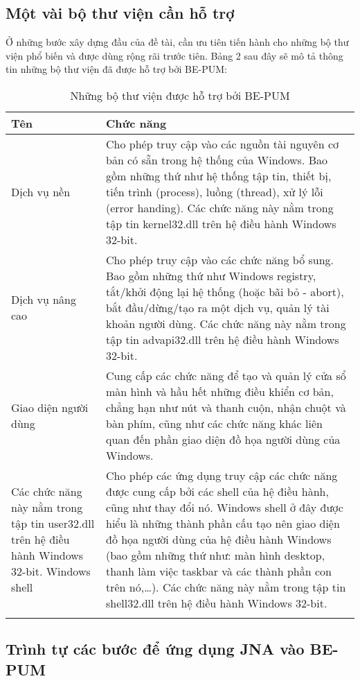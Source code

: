 	\subsection{Một vài bộ thư viện cần hỗ trợ}

Ở những bước xây dựng đầu của đề tài, cần ưu tiên tiến hành cho những bộ thư viện phổ biến và được dùng rộng rãi trước tiên. Bảng 2 sau đây sẽ mô tả thông tin những bộ thư viện đã được hỗ trợ bởi BE-PUM:


\begin{longtable}{ | m{3cm} | m{11cm} | }
	\hline
Tên & Chức năng\\
	\hline
	\hline
Dịch vụ nền & Cho phép truy cập vào các nguồn tài nguyên cơ bản có sẵn trong hệ thống của Windows. Bao gồm những thứ như hệ thống tập tin, thiết bị, tiến trình (process), luồng (thread), xử lý lỗi (error handing).
Các chức năng này nằm trong tập tin kernel32.dll trên hệ điều hành Windows 32-bit.\\
	\hline
Dịch vụ nâng cao & Cho phép truy cập vào các chức năng bổ sung. Bao gồm những thứ như Windows registry, tắt/khởi động lại hệ thống (hoặc bãi bỏ - abort), bắt đầu/dừng/tạo ra một dịch vụ, quản lý tài khoản người dùng.
Các chức năng này nằm trong tập tin advapi32.dll trên hệ điều hành Windows 32-bit.\\
	\hline
Giao diện người dùng & Cung cấp các chức năng để tạo và quản lý cửa sổ màn hình và hầu hết những điều khiển cơ bản, chẳng hạn như nút và thanh cuộn, nhận chuột và bàn phím, cũng như các chức năng khác liên quan đến phần giao diện đồ họa người dùng của Windows.\\
	\hline
Các chức năng này nằm trong tập tin user32.dll trên hệ điều hành Windows 32-bit.
Windows shell & Cho phép các ứng dụng truy cập các chức năng được cung cấp bởi các shell của hệ điều hành, cũng như thay đổi nó.
Windows shell ở đây được hiểu là những thành phần cấu tạo nên giao diện đồ họa người dùng của hệ điều hành Windows (bao gồm những thứ như: màn hình desktop, thanh làm việc taskbar và các thành phần con trên nó,…).
Các chức năng này nằm trong tập tin shell32.dll trên hệ điều hành Windows 32-bit.\\
	\hline

\caption[Những bộ thư viện được hỗ trợ bởi BE-PUM]{Những bộ thư viện được hỗ trợ bởi BE-PUM}
\label{table:tblwapilib}
\end{longtable}


	\subsection{Trình tự các bước để ứng dụng JNA vào BE-PUM}

